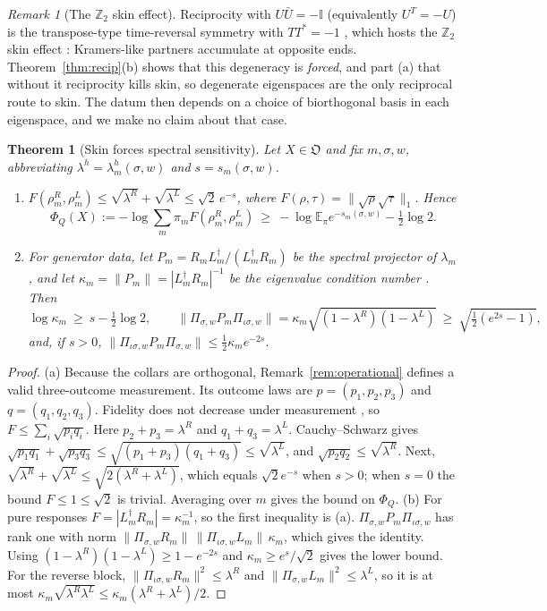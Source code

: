 \documentclass[11pt]{article}
\newtheorem{theorem}{Theorem}
\theoremstyle{definition}
\theoremstyle{remark}
\newtheorem{remark}{Remark}
\newcommand{\E}{\mathbb{E}}
\newcommand{\one}{\mathbb{I}}
\newcommand{\Obj}{\mathfrak{O}}
\newcommand{\isig}{\iota\sigma}
\begin{document}
\begin{remark}[The $\mathbb Z_2$ skin effect]\label{rem:z2}
Reciprocity with $U\bar U=-\one$ (equivalently $U^T=-U$) is the transpose-type time-reversal symmetry with $TT^*=-1$ \cite{KSUS19}, which hosts the $\mathbb Z_2$ skin effect \cite{OKSS20}: Kramers-like partners accumulate at opposite ends. Theorem~\ref{thm:recip}(b) shows that this degeneracy is \emph{forced}, and part (a) that without it reciprocity kills skin, so degenerate eigenspaces are the only reciprocal route to skin. The datum then depends on a choice of biorthogonal basis in each eigenspace, and we make no claim about that case.
\end{remark}

\begin{theorem}[Skin forces spectral sensitivity]\label{thm:sens}
Let $X\in\Obj$ and fix $m,\sigma,w$, abbreviating $\lambda^h=\lambda^h_m(\sigma,w)$ and $s=s_m(\sigma,w)$.
\begin{enumerate}
\item[(a)] $F(\rho^R_m,\rho^L_m)\le\sqrt{\lambda^R}+\sqrt{\lambda^L}\le\sqrt2\,e^{-s}$, where $F(\rho,\tau)=\|\sqrt\rho\sqrt\tau\|_1$. Hence
\[
\Phi_Q(X):=-\log\sum_m\pi_mF(\rho^R_m,\rho^L_m)\ \ge\ -\log\E_\pi e^{-s_m(\sigma,w)}-\tfrac12\log2 .
\]
\item[(b)] For generator data, let $P_m=R_mL_m^\dagger/(L_m^\dagger R_m)$ be the spectral projector of $\lambda_m$, and let $\kappa_m=\|P_m\|=|L_m^\dagger R_m|^{-1}$ be the eigenvalue condition number \cite{Wil65,TE05}. Then
\[
\log\kappa_m\ \ge\ s-\tfrac12\log 2,\qquad
\|\Pi_{\sigma,w}P_m\Pi_{\isig,w}\|=\kappa_m\sqrt{(1-\lambda^R)(1-\lambda^L)}\ \ge\ \sqrt{\tfrac12(e^{2s}-1)},
\]
and, if $s>0$, $\|\Pi_{\isig,w}P_m\Pi_{\sigma,w}\|\le\frac12\kappa_me^{-2s}$.
\end{enumerate}
\end{theorem}
\begin{proof}
(a) Because the collars are orthogonal, Remark~\ref{rem:operational} defines a valid three-outcome measurement. Its outcome laws are $p=(p_1,p_2,p_3)$ and $q=(q_1,q_2,q_3)$. Fidelity does not decrease under measurement \cite{Uhl76}, so $F\le\sum_i\sqrt{p_iq_i}$. Here $p_2+p_3=\lambda^R$ and $q_1+q_3=\lambda^L$. Cauchy--Schwarz gives $\sqrt{p_1q_1}+\sqrt{p_3q_3}\le\sqrt{(p_1+p_3)(q_1+q_3)}\le\sqrt{\lambda^L}$, and $\sqrt{p_2q_2}\le\sqrt{\lambda^R}$. Next, $\sqrt{\lambda^R}+\sqrt{\lambda^L}\le\sqrt{2(\lambda^R+\lambda^L)}$, which equals $\sqrt2e^{-s}$ when $s>0$; when $s=0$ the bound $F\le1\le\sqrt2$ is trivial. Averaging over $m$ gives the bound on $\Phi_Q$.
(b) For pure responses $F=|L_m^\dagger R_m|=\kappa_m^{-1}$, so the first inequality is (a). $\Pi_{\sigma,w}P_m\Pi_{\isig,w}$ has rank one with norm $\|\Pi_{\sigma,w}R_m\|\,\|\Pi_{\isig,w}L_m\|\,\kappa_m$, which gives the identity. Using $(1-\lambda^R)(1-\lambda^L)\ge1-e^{-2s}$ and $\kappa_m\ge e^{s}/\sqrt2$ gives the lower bound. For the reverse block, $\|\Pi_{\isig,w}R_m\|^2\le\lambda^R$ and $\|\Pi_{\sigma,w}L_m\|^2\le\lambda^L$, so it is at most $\kappa_m\sqrt{\lambda^R\lambda^L}\le\kappa_m(\lambda^R+\lambda^L)/2$.
\end{proof}
\end{document}
